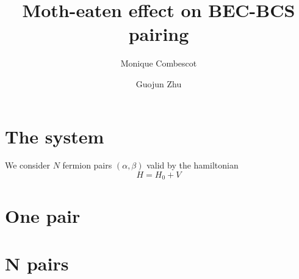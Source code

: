 \documentclass{article}
\author{Monique Combescot \and Guojun Zhu}
\title{Moth-eaten effect on BEC-BCS pairing}
\begin{document}
\maketitle

\section{The system}
We consider $N$ fermion pairs $(\alpha,\beta)$ valid by the hamiltonian
\begin{equation}
H=H_{0}+V
\end{equation}
\section{One pair}
\section{N pairs}
{}


%

\end{document}

